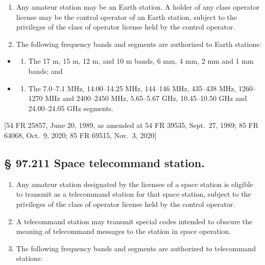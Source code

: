 \documentclass[
  letterpaper,
  DIV=11,
  numbers=noendperiod]{scrreport}
\providecommand{\tightlist}{%
  \setlength{\itemsep}{0pt}\setlength{\parskip}{0pt}}\usepackage{longtable,booktabs,array}
\begin{document}
\begin{enumerate}
\def\labelenumi{(\alph{enumi})}
\item
  Any amateur station may be an Earth station. A holder of any class
  operator license may be the control operator of an Earth station,
  subject to the privileges of the class of operator license held by the
  control operator.
\item
  The following frequency bands and segments are authorized to Earth
  stations:
\end{enumerate}

\begin{itemize}
\item
  \begin{enumerate}
  \def\labelenumi{(\arabic{enumi})}
  \tightlist
  \item
    The 17 m, 15 m, 12 m, and 10 m bands, 6 mm, 4 mm, 2 mm and 1 mm
    bands; and
  \end{enumerate}
\item
  \begin{enumerate}
  \def\labelenumi{(\arabic{enumi})}
  \setcounter{enumi}{1}
  \tightlist
  \item
    The 7.0--7.1 MHz, 14.00--14.25 MHz, 144--146 MHz, 435--438 MHz,
    1260--1270 MHz and 2400--2450 MHz, 5.65--5.67 GHz, 10.45--10.50 GHz
    and 24.00--24.05 GHz segments.
  \end{enumerate}
\end{itemize}

{[}54 FR 25857, June 20, 1989, as amended at 54 FR 39535, Sept.~27,
1989; 85 FR 64068, Oct.~9, 2020; 85 FR 69515, Nov.~3, 2020{]}

\hypertarget{space-telecommand-station.}{%
\subsection*{§ 97.211 Space telecommand
station.}\label{space-telecommand-station.}}

\begin{enumerate}
\def\labelenumi{(\alph{enumi})}
\item
  Any amateur station designated by the licensee of a space station is
  eligible to transmit as a telecommand station for that space station,
  subject to the privileges of the class of operator license held by the
  control operator.
\item
  A telecommand station may transmit special codes intended to obscure
  the meaning of telecommand messages to the station in space operation.
\item
  The following frequency bands and segments are authorized to
  telecommand stations:
\end{enumerate}
\end{document}
